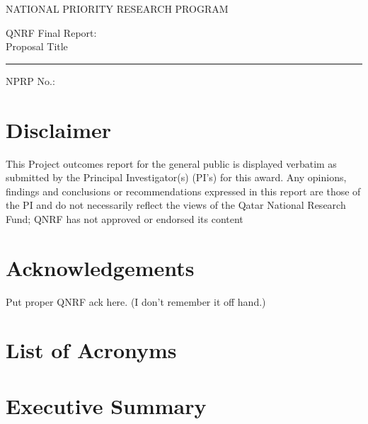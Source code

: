 \documentclass[11pt,letterpaper]{article}
\begin{document}
\begin{titlepage}
\begin{center}
\fontsize{11}{15}
\selectfont
NATIONAL PRIORITY RESEARCH PROGRAM

\vspace{4.5cm}

\fontsize{40}{48}
\selectfont
QNRF Final Report:\\
Proposal Title
\vspace{0.4cm}
{\color{blue2}\hrule}
\vspace{0.4cm}
\fontsize{22}{26}
\selectfont
NPRP No.:

\end{center}
\end{titlepage}

\rfoot{}

\newpage
\section*{Disclaimer}
This Project outcomes report for the general public is displayed verbatim as submitted by the Principal Investigator(s) (PI’s) for this award. Any opinions, findings and conclusions or recommendations expressed in this report are those of the PI and do not necessarily reflect the views of the Qatar National Research Fund; QNRF has not approved or endorsed its content

\newpage
\section*{Acknowledgements}
Put proper QNRF ack here.  (I don't remember it off hand.)

\newpage
\setcounter{page}{1}
\renewcommand\contentsname{Table of Contents}
\tableofcontents

\newpage
\listoftables

\newpage
\listoffigures

\newpage
\section*{List of Acronyms}

\newpage
\section*{Executive Summary}
\end{document}
